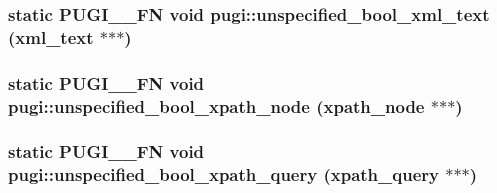 \label{namespacepugi_a487b2e720a3808d6fd5730d7c97bcdac}
\hypertarget{namespacepugi_acfae514de3abac05ed155e531a401c15}{
\subsubsection[{unspecified\_\-bool\_\-xml\_\-text}]{\setlength{\rightskip}{0pt plus 5cm}static PUGI\_\-\_\-FN void pugi::unspecified\_\-bool\_\-xml\_\-text (xml\_\-text $\ast$$\ast$$\ast$)}}
\label{namespacepugi_acfae514de3abac05ed155e531a401c15}
\hypertarget{namespacepugi_abca519e72b848d2ebadf5250727da6c5}{
\subsubsection[{unspecified\_\-bool\_\-xpath\_\-node}]{\setlength{\rightskip}{0pt plus 5cm}static PUGI\_\-\_\-FN void pugi::unspecified\_\-bool\_\-xpath\_\-node (xpath\_\-node $\ast$$\ast$$\ast$)}}
\label{namespacepugi_abca519e72b848d2ebadf5250727da6c5}
\hypertarget{namespacepugi_a41b925609dde7657664cf68c6506838b}{
\subsubsection[{unspecified\_\-bool\_\-xpath\_\-query}]{\setlength{\rightskip}{0pt plus 5cm}static PUGI\_\-\_\-FN void pugi::unspecified\_\-bool\_\-xpath\_\-query (xpath\_\-query $\ast$$\ast$$\ast$)}}
\label{namespacepugi_a41b925609dde7657664cf68c6506838b}
